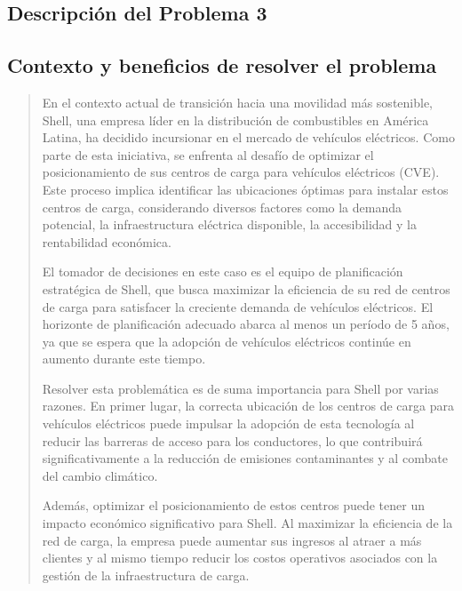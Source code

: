 \documentclass[letterpaper]{article}
\begin{document}
\newpage
\begin{flushleft}
\section{Descripción del Problema 3}
\subsection{Contexto y beneficios de resolver el problema}
\begin{quote}
    En el contexto actual de transición hacia una movilidad más sostenible, Shell, una empresa líder en la distribución de combustibles en América Latina, ha decidido incursionar en el mercado de vehículos eléctricos. Como parte de esta iniciativa, se enfrenta al desafío de optimizar el posicionamiento de sus centros de carga para vehículos eléctricos (CVE). Este proceso implica identificar las ubicaciones óptimas para instalar estos centros de carga, considerando diversos factores como la demanda potencial, la infraestructura eléctrica disponible, la accesibilidad y la rentabilidad económica. 

    El tomador de decisiones en este caso es el equipo de planificación estratégica de Shell, que busca maximizar la eficiencia de su red de centros de carga para satisfacer la creciente demanda de vehículos eléctricos. El horizonte de planificación adecuado abarca al menos un período de 5 años, ya que se espera que la adopción de vehículos eléctricos continúe en aumento durante este tiempo. 

    Resolver esta problemática es de suma importancia para Shell por varias razones. En primer lugar, la correcta ubicación de los centros de carga para vehículos eléctricos puede impulsar la adopción de esta tecnología al reducir las barreras de acceso para los conductores, lo que contribuirá significativamente a la reducción de emisiones contaminantes y al combate del cambio climático. 

    Además, optimizar el posicionamiento de estos centros puede tener un impacto económico significativo para Shell. Al maximizar la eficiencia de la red de carga, la empresa puede aumentar sus ingresos al atraer a más clientes y al mismo tiempo reducir los costos operativos asociados con la gestión de la infraestructura de carga. 

\end{quote}


\end{flushleft}
\end{document}
